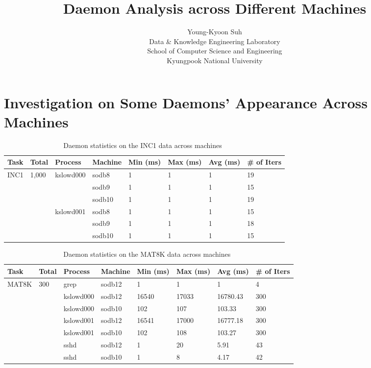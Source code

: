 \documentclass[10pt]{article}
\begin{document}
\title{Daemon Analysis across Different Machines}

\author{
Young-Kyoon Suh\\
Data \& Knowledge Engineering Laboratory\\
School of Computer Science and Engineering\\
Kyungpook National University\\
}
\maketitle

\section{Investigation on Some Daemons' Appearance Across Machines} 

\begin{table}[htp!]
\centering
{\small
 \begin{tabular}{|l|l|l|l|l||l|l|l|} \hline
 Task & Total & Process & Machine & Min (ms) & Max (ms) & Avg (ms) & \# of Iters\\ \hline
 INC1 &  1,000 & kslowd000 & sodb8 & 1 & 1 & 1 & 19 \\ \hline
 &   &  & sodb9 & 1 & 1 & 1 & 15 \\ \hline
 &   &  & sodb10 & 1 & 1 & 1 & 19 \\ \hline 
 \hline
  &  & kslowd001 & sodb8 & 1 & 1 & 1 & 15 \\ \hline
 &   &  & sodb9 & 1 & 1 & 1 & 18 \\ \hline
 &   &  & sodb10 & 1 & 1 & 1 & 15 \\ \hline 
 \end{tabular}
  }
 \caption{Daemon statistics on the INC1 data across machines~\label{tab:inc1}}
\end{table}

\begin{table}[htp!]
\centering
{\small
 \begin{tabular}{|l|l|l|l|l||l|l|l|} \hline
 Task & Total & Process & Machine & Min (ms) & Max (ms) & Avg (ms) & \# of Iters\\ \hline
 MAT8K & 300 & grep & sodb12 & 1 & 1 & 1 & 4 \\ \hline
 \hline
  &  & kslowd000  & sodb12 & 16540 & 17033 & 16780.43 & 300 \\ \hline
 &  & kslowd000	& sodb10 & 102 & 107 & 103.33 & 300 \\ \hline 
 \hline
  &  & kslowd001  & sodb12 & 16541 & 17000 & 16777.18 & 300 \\ \hline
  &  & kslowd001	& sodb10 & 102 & 108 & 103.27 & 300 \\ \hline 
 \hline
  &  & sshd  & sodb12 & 1 & 20 & 5.91 & 43 \\ \hline
 &  & sshd & sodb10 & 1 & 8  &  4.17 & 42 \\ \hline 
 \end{tabular}
  }
 \caption{Daemon statistics on the MAT8K data across machines~\label{tab:mat8K}}
\end{table}
\end{document}
